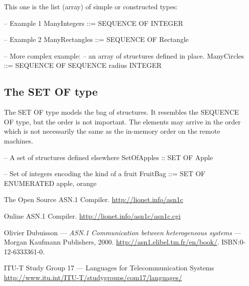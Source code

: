 \documentclass[english,oneside,12pt]{book}
\begin{document}
This one is the list (array) of simple or constructed types:
\begin{asn}
-- Example 1
ManyIntegers ::= SEQUENCE OF INTEGER

-- Example 2
ManyRectangles ::= SEQUENCE OF Rectangle

-- More complex example:
-- an array of structures defined in place.
ManyCircles ::= SEQUENCE OF SEQUENCE {
                            radius INTEGER
                            }
\end{asn}

\subsection{The SET OF type}

The SET OF type models the bag of structures. It resembles the SEQUENCE
OF type, but the order is not important. The elements may arrive
in the order which is not necessarily the same as the in-memory order
on the remote machines.
\begin{asn}
-- A set of structures defined elsewhere
SetOfApples :: SET OF Apple

-- Set of integers encoding the kind of a fruit
FruitBag ::= SET OF ENUMERATED { apple, orange }
\end{asn}
\begin{thebibliography}{ITU-T/ASN.1}
The Open Source ASN.1 Compiler. \url{http://lionet.info/asn1c}

Online ASN.1 Compiler. \url{http://lionet.info/asn1c/asn1c.cgi}

Olivier Dubuisson --- \emph{ASN.1 Communication
between heterogeneous systems} --- Morgan Kaufmann Publishers, 2000.
\url{http://asn1.elibel.tm.fr/en/book/}. ISBN:0-12-6333361-0.

ITU-T Study Group 17 --- Languages
for Telecommunication Systems \url{http://www.itu.int/ITU-T/studygroups/com17/languages/}
\end{thebibliography}
\end{document}
